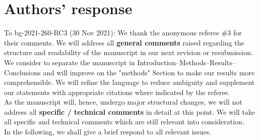 \documentclass{scrartcl}
\begin{document}
\section*{Authors' response}
To bg-2021-260-RC3 (30 Nov 2021):
We thank the anonymous referee \#3 for their comments.
We will address all \textbf{general comments} raised regarding the structure and readability of the manuscript in our next revision or resubmission. We consider to separate the manuscript in Introduction--Methods--Results--Conclusions and will improve on the "methods" Section to make our results more comprehensible. We will refine the language to reduce ambiguity and supplement our statements with appropriate citations where indicated by the referee.\\
As the manuscript will, hence, undergo major structural changes, we will not address all \textbf{specific / technical comments} in detail at this point. We will take all specific and technical comments which are still relevant into consideration.\\
In the following, we shall give a brief respond to all relevant issues.
\end{document}
